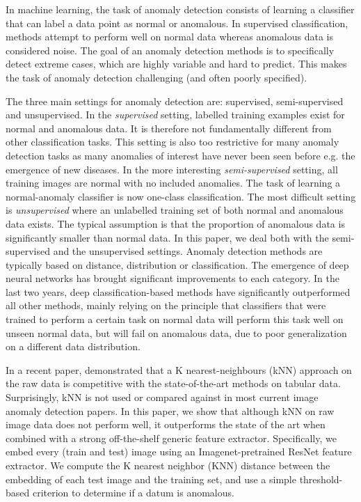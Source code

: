 \documentclass{article}
\begin{document}
In machine learning, the task of anomaly detection consists of learning a classifier that can label a data point as normal or anomalous. In supervised classification, methods attempt to perform well on normal data whereas anomalous data is considered noise. The goal of an anomaly detection methods is to specifically detect extreme cases, which are highly variable and hard to predict. This makes the task of anomaly detection challenging (and often poorly specified). 

The three main settings for anomaly detection are: supervised, semi-supervised and unsupervised. In the \textit{supervised} setting, labelled training examples exist for normal and anomalous data. It is therefore not fundamentally different from other classification tasks. This setting is also too restrictive for many anomaly detection tasks as many anomalies of interest have never been seen before e.g. the emergence of new diseases. In the more interesting \textit{semi-supervised} setting, all training images are normal with no included anomalies. The task of learning a normal-anomaly classifier is now one-class classification. The most difficult setting is \textit{unsupervised} where an unlabelled training set of both normal and anomalous data exists. The typical assumption is that the proportion of anomalous data is significantly smaller than normal data. In this paper, we deal both with the semi-supervised and the unsupervised settings. 
Anomaly detection methods are typically based on distance, distribution or classification. The emergence of deep neural networks has brought significant improvements to each category. In the last two years, deep classification-based methods have significantly outperformed all other methods, mainly relying on the principle that classifiers that were trained to perform a certain task on normal data will perform this task well on unseen normal data, but will fail on anomalous data, due to poor generalization on a different data distribution. 

In a recent paper, \citet{gu2019statistical} demonstrated that a K nearest-neighbours (kNN) approach on the raw data is competitive with the state-of-the-art methods on tabular data. Surprisingly, kNN is not used or compared against in most current image anomaly detection papers. In this paper, we show that although kNN on raw image data does not perform well, it outperforms the state of the art when combined with a strong off-the-shelf generic feature extractor. Specifically, we embed every (train and test) image using an Imagenet-pretrained ResNet feature extractor. We compute the K nearest neighbor (KNN) distance between the embedding of each test image and the training set, and use a simple threshold-based criterion to determine if a datum is anomalous. 
\end{document}
